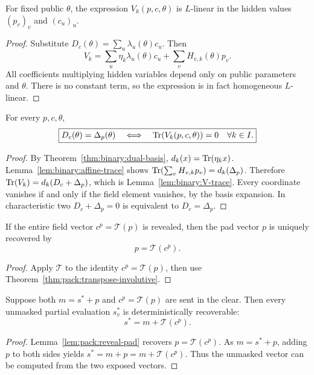 \begin{lemma}\label{lem:pack:V-affine}
For fixed public $\theta$,
the expression $V_k(p,c,\theta)$
is $L$-linear in the hidden values
$(p_v)_v$ and $(c_u)_u$.
\end{lemma}
\begin{proof}
Substitute
$D_c(\theta)=\sum_u\lambda_u(\theta)c_u$.
Then
\[
 V_k=\sum_u\eta_k\lambda_u(\theta)c_u
       +\sum_vH_{v,k}(\theta)p_v.
\]
All coefficients multiplying hidden
variables depend only on public
parameters and $\theta$.
There is no constant term, so the
expression is in fact homogeneous
$L$-linear.
\end{proof}

\begin{theorem}\label{thm:pack:trace-correct}
For every $p,c,\theta$,
\[
 \boxed{
 D_c(\theta)=\Delta_p(\theta)
 \quad\Longleftrightarrow\quad
 \operatorname{Tr}(V_k(p,c,\theta))=0\quad\forall k\in I.}
\]
\end{theorem}
\begin{proof}
By Theorem~\ref{thm:binary:dual-basis},
$d_k(x)=\operatorname{Tr}(\eta_kx)$.
Lemma~\ref{lem:binary:affine-trace}
shows
$\operatorname{Tr}(\sum_vH_{v,k}p_v)
 =d_k(\Delta_p)$.
Therefore
$\operatorname{Tr}(V_k)=d_k(D_c+\Delta_p)$,
which is Lemma~\ref{lem:binary:V-trace}.
Every coordinate vanishes if and only
if the field element vanishes,
by the basis expansion.
In characteristic two
$D_c+\Delta_p=0$ is equivalent to
$D_c=\Delta_p$.
\end{proof}

\begin{lemma}\label{lem:pack:reveal-pad}
If the entire field vector $c^p=\mathcal T(p)$
is revealed, then the pad vector $p$
is uniquely recovered by
\[
 \boxed{p=\mathcal T(c^p).}
\]
\end{lemma}
\begin{proof}
Apply $\mathcal T$ to the identity
$c^p=\mathcal T(p)$, then use
Theorem~\ref{thm:pack:transpose-involutive}.
\end{proof}

\begin{theorem}\label{thm:pack:reveal-leak}
Suppose both $m=s^*+p$ and
$c^p=\mathcal T(p)$ are sent in the clear.
Then every unmasked partial evaluation
$s_v^*$ is deterministically recoverable:
\[
 \boxed{s^*=m+\mathcal T(c^p).}
\]
\end{theorem}
\begin{proof}
Lemma~\ref{lem:pack:reveal-pad}
recovers $p=\mathcal T(c^p)$.
As $m=s^*+p$, adding $p$ to
both sides yields
$s^*=m+p=m+\mathcal T(c^p)$.
Thus the unmasked vector can be
computed from the two exposed vectors.
\end{proof}

